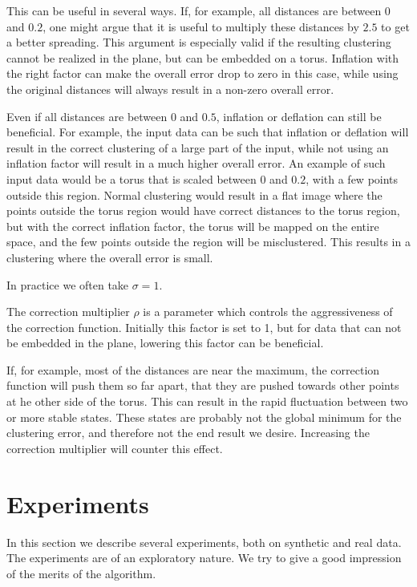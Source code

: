 \documentclass{article}
\theoremstyle{definition}
\begin{document}
This can be useful in several ways. If, for example, all distances are between
$0$ and $0.2$, one might argue that it is useful to multiply these distances by
$2.5$ to get a better spreading. This argument is especially valid if the
resulting clustering cannot be realized in the plane, but can be embedded on a
torus. Inflation with the right factor can make the overall error drop to zero
in this case, while using the original distances will always result in a
non-zero overall error.

Even if all distances are between $0$ and $0.5$, inflation or deflation can
still be beneficial. For example, the input data can be such that inflation or
deflation will result in the correct clustering of a large part of the input,
while not using an inflation factor will result in a much higher overall error.
An example of such input data would be a torus that is scaled between $0$ and
$0.2$, with a few points outside this region. Normal clustering would result in
a flat image where the points outside the torus region would have correct
distances to the torus region, but with the correct inflation factor, the torus
will be mapped on the entire space, and the few points outside the region will
be misclustered. This results in a clustering where the overall error is small.

In practice we often take $\sigma=1$.

The correction multiplier $\rho$ is a parameter which controls the
aggressiveness of the correction function. Initially this factor is set to 1,
but for data that can not be embedded in the plane, lowering this factor can be
beneficial.

If, for example, most of the distances are near the maximum, the correction
function will push them so far apart, that they are pushed towards other points
at he other side of the torus. This can result in the rapid fluctuation between
two or more stable states. These states are probably not the global minimum for
the clustering error, and therefore not the end result we desire. Increasing
the correction multiplier will counter this effect.


\section{Experiments}\label{to:exps}
In this section we describe several experiments, both on synthetic and real
data. The experiments are of an exploratory nature. We try to give a good
impression of the merits of the algorithm.
\end{document}
